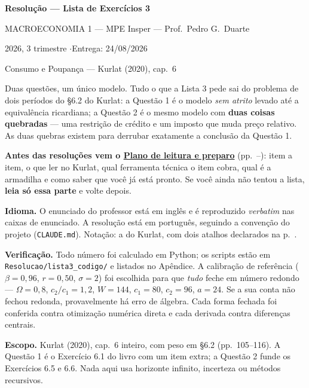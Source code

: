 \documentclass[11pt, a4paper]{article}
\begin{document}
\begin{center}
{\LARGE\bfseries\color{darkblue} Resolução --- Lista de Exercícios 3\par}
\vspace{4pt}
{\large MACROECONOMIA 1 --- MPE Insper --- Prof.\ Pedro G.\ Duarte\par}
\vspace{2pt}
{\normalsize 2026, 3\textordmasculine{} trimestre \quad$\cdot$\quad Entrega: 24/08/2026\par}
\vspace{2pt}
{\small Consumo e Poupança --- Kurlat (2020), cap.\ 6\par}
\end{center}
\vspace{6pt}

\begin{tcolorbox}[theorybox, title={Como ler este documento}]
\small
Duas questões, um único modelo. Tudo o que a Lista 3 pede sai do problema de dois
períodos do §6.2 do Kurlat: a Questão 1 é o modelo \emph{sem atrito} levado até a
equivalência ricardiana; a Questão 2 é o mesmo modelo com \textbf{duas coisas
quebradas} --- uma restrição de crédito e um imposto que muda preço relativo. As duas
quebras existem para derrubar exatamente a conclusão da Questão 1.

\smallskip
\textbf{Antes das resoluções vem o \hyperref[sec:plano]{Plano de leitura e preparo}}
(pp.\ \pageref{sec:plano}--\pageref{sec:fimplano}): item a item, o que ler no Kurlat, qual
ferramenta técnica o item cobra, qual é a armadilha e como saber que você já está pronto.
Se você ainda não tentou a lista, \textbf{leia só essa parte} e volte depois.

\smallskip
\textbf{Idioma.} O enunciado do professor está em inglês e é reproduzido \emph{verbatim} nas
caixas de enunciado. A resolução está em português, seguindo a convenção do projeto
(\texttt{CLAUDE.md}). Notação: a do Kurlat, com dois atalhos declarados na p.\
\pageref{sec:notacao}.

\smallskip
\textbf{Verificação.} Todo número foi calculado em Python; os scripts estão em
\texttt{Resolucao/lista3\_codigo/} e listados no Apêndice. A calibração de referência
($\beta=0{,}96$, $r=0{,}50$, $\sigma=2$) foi escolhida para que \emph{tudo} feche em número
redondo --- $\Omega=0{,}8$, $c_2/c_1=1{,}2$, $W=144$, $c_1=80$, $c_2=96$, $a=24$. Se a sua
conta não fechou redonda, provavelmente há erro de álgebra. Cada forma fechada foi
conferida contra otimização numérica direta e cada derivada contra diferenças centrais.

\smallskip
\textbf{Escopo.} Kurlat (2020), cap.\ 6 inteiro, com peso em §6.2 (pp.\ 105--116). A
Questão 1 é o Exercício 6.1 do livro com um item extra; a Questão 2 funde os Exercícios 6.5
e 6.6. Nada aqui usa horizonte infinito, incerteza ou métodos recursivos.
\end{tcolorbox}
\end{document}
